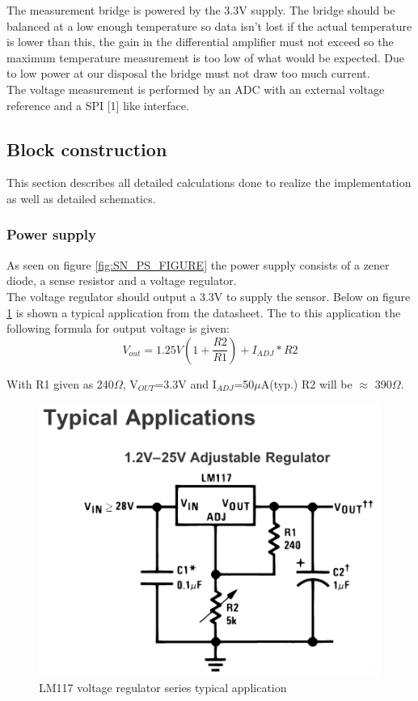 The measurement bridge is powered by the 3.3V supply. The bridge should be balanced at a low enough temperature so data isn't lost if the actual temperature is lower than this, the gain in the differential amplifier must not exceed so the maximum temperature measurement is too low of what would be expected. Due to low power at our disposal the bridge must not draw too much current.\\
The voltage measurement is performed by an ADC with an external voltage reference and a SPI [1] like interface.

\subsection{Block construction}
This section describes all detailed calculations done to realize the implementation as well as detailed schematics.\\

\subsubsection{Power supply}
As seen on figure \ref{fig:SN_PS_FIGURE} the power supply consists of a zener diode, a sense resistor and a voltage regulator.\\
The voltage regulator should output a 3.3V to supply the sensor. Below on figure \ref{fig:LM317} is shown a typical application from the datasheet. The to this application the following formula for output voltage is given:\\
\begin{equation}
	V_{out}=1.25V\left(1+\frac{R2}{R1}\right)+ I_{ADJ}*R2
\end{equation}

With R1 given as 240$\Omega$, V$_{OUT}$=3.3V and I$_{ADJ}$=50$\mu$A(typ.) R2 will be $\approx$ 390$\Omega$.


\begin{figure}[H]
	\centering
	\includegraphics[width=.5\textwidth]{billeder/LM317}
	\caption{LM117 voltage regulator series typical application}
	\label{fig:LM317}
\end{figure}

